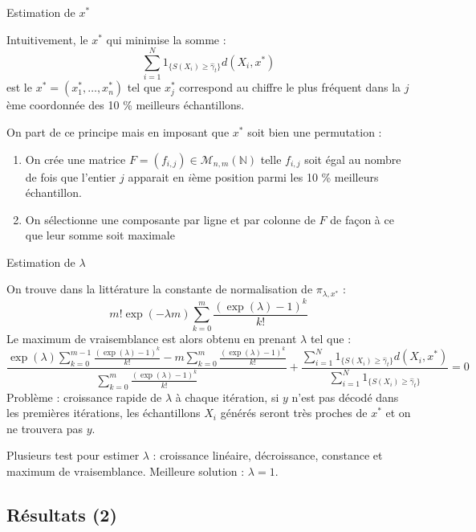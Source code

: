 \documentclass[10pt,xcolor=table,color={dvipsnames,usenames},ignorenonframetext,usepdftitle=false,french]{beamer}
\begin{document}
\begin{frame}{Estimation de \(x^*\)}
\protect\hypertarget{estimation-de-x}{}

Intuitivement, le \(x^*\) qui minimise la somme :
\[\sum_{i=1}^N 1_{\{S(X_{i})\geq\hat{\gamma}_{t}\}}d(X_i,x^*)\] est le
\(x^*=(x_1^*,\dots,x_n^*)\) tel que \(x_j^*\) correspond au chiffre le
plus fréquent dans la \(j\)ème coordonnée des 10 \% meilleurs
échantillons.

On part de ce principe mais en imposant que \(x^*\) soit bien une
permutation :

\begin{enumerate}
\item
  On crée une matrice \(F=(f_{i,j})\in\mathcal M_{n,m}(\mathbb{N})\)
  telle \(f_{i,j}\) soit égal au nombre de fois que l'entier \(j\)
  apparait en \(i\)ème position parmi les 10 \% meilleurs échantillon.
\item
  On sélectionne une composante par ligne et par colonne de \(F\) de
  façon à ce que leur somme soit maximale
\end{enumerate}

\end{frame}

\begin{frame}{Estimation de \(\lambda\)}
\protect\hypertarget{estimation-de-lambda}{}

On trouve dans la littérature la constante de normalisation de
\(\pi_{\lambda,x^*}\) : \[
m!\exp(-\lambda m)\sum_{k=0}^{m}\frac{(\exp(\lambda)-1)^{k}}{k!}
\] Le maximum de vraisemblance est alors obtenu en prenant \(\lambda\)
tel que : \[
\frac{
\exp(\lambda)\sum_{k=0}^{m-1}\frac{(\exp(\lambda)-1)^{k}}{k!} -
m\sum_{k=0}^{m}\frac{(\exp(\lambda)-1)^{k}}{k!}
}{
\sum_{k=0}^{m}\frac{(\exp(\lambda)-1)^{k}}{k!}
} +
\frac{\sum_{i=1}^N 1_{\{S(X_{i})\geq\hat{\gamma}_{t}\}}d(X_i,x^*)}{\sum_{i=1}^N 1_{\{S(X_{i})\geq\hat{\gamma}_{t}\}}} = 0
\] Problème : croissance rapide de \(\lambda\) à chaque itération, si
\(y\) n'est pas décodé dans les premières itérations, les échantillons
\(X_i\) générés seront très proches de \(x^*\) et on ne trouvera pas
\(y\).

Plusieurs test pour estimer \(\lambda\) : croissance linéaire,
décroissance, constance et maximum de vraisemblance. Meilleure solution
: \(\lambda = 1\).

\end{frame}

\hypertarget{ruxe9sultats-2-1}{%
\subsection{Résultats (2)}\label{ruxe9sultats-2-1}}
\end{document}
